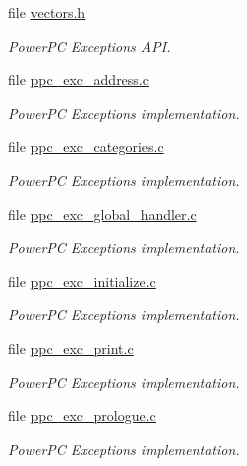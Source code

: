 \begin{DoxyCompactItemize}
\item 
file \mbox{\hyperlink{bsp_2vectors_8h}{vectors.\+h}}
\begin{DoxyCompactList}\small\item\em Power\+PC Exceptions A\+PI. \end{DoxyCompactList}\item 
file \mbox{\hyperlink{ppc__exc__address_8c}{ppc\+\_\+exc\+\_\+address.\+c}}
\begin{DoxyCompactList}\small\item\em Power\+PC Exceptions implementation. \end{DoxyCompactList}\item 
file \mbox{\hyperlink{ppc__exc__categories_8c}{ppc\+\_\+exc\+\_\+categories.\+c}}
\begin{DoxyCompactList}\small\item\em Power\+PC Exceptions implementation. \end{DoxyCompactList}\item 
file \mbox{\hyperlink{ppc__exc__global__handler_8c}{ppc\+\_\+exc\+\_\+global\+\_\+handler.\+c}}
\begin{DoxyCompactList}\small\item\em Power\+PC Exceptions implementation. \end{DoxyCompactList}\item 
file \mbox{\hyperlink{ppc__exc__initialize_8c}{ppc\+\_\+exc\+\_\+initialize.\+c}}
\begin{DoxyCompactList}\small\item\em Power\+PC Exceptions implementation. \end{DoxyCompactList}\item 
file \mbox{\hyperlink{ppc__exc__print_8c}{ppc\+\_\+exc\+\_\+print.\+c}}
\begin{DoxyCompactList}\small\item\em Power\+PC Exceptions implementation. \end{DoxyCompactList}\item 
file \mbox{\hyperlink{ppc__exc__prologue_8c}{ppc\+\_\+exc\+\_\+prologue.\+c}}
\begin{DoxyCompactList}\small\item\em Power\+PC Exceptions implementation. \end{DoxyCompactList}\end{DoxyCompactItemize}

